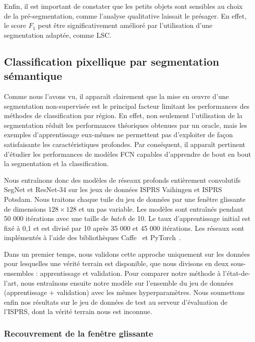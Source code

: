 Enfin, il est important de constater que les petits objets sont sensibles au choix de la pré-segmentation, comme l'analyse qualitative laissait le présager. En effet, le score $F_1$ peut être significativement amélioré par l'utilisation d'une segmentation adaptée, comme \gls{LSC}.

\subsection{Classification pixellique par segmentation sémantique}

Comme nous l'avons vu, il apparaît clairement que la mise en \oe{}uvre d'une segmentation non-supervisée est le principal facteur limitant les performances des méthodes de classification par région. En effet, non seulement l'utilisation de la segmentation réduit les performances théoriques obtenues par un oracle, mais les exemples d'apprentissage eux-mêmes ne permettent pas d'exploiter de façon satisfaisante les caractéristiques profondes. Par conséquent, il apparaît pertinent d'étudier les performances de modèles \gls{FCN} capables d'apprendre de bout en bout la segmentation et la classification.

Nous entraînons donc des modèles de réseaux profonds entièrement convolutifs SegNet et ResNet-34 sur les jeux de données \gls{ISPRS} Vaihingen et \gls{ISPRS} Potsdam.
Nous traitons chaque tuile du jeu de données par une fenêtre glissante de dimensions $128 \times 128$ et un pas variable. Les modèles sont entraînés pendant 50 000 itérations avec une taille de \emph{batch} de 10. Le taux d'apprentissage initial est fixé à 0,1 et est divisé par 10 après 35 000 et 45 000 itérations.
Les réseaux sont implémentés à l'aide des bibliothèques Caffe~\cite{jia_caffe_2014} et PyTorch~\cite{paszke_automatic_2017}.

Dans un premier temps, nous validons cette approche uniquement sur les données pour lesquelles une vérité terrain est disponible, que nous divisons en deux sous-ensembles : apprentissage et validation. Pour comparer notre méthode à l'état-de-l'art, nous entraînons ensuite notre modèle sur l'ensemble du jeu de données (apprentissage + validation) avec les mêmes hyperparamètres. Nous soumettons enfin nos résultats sur le jeu de données de test au serveur d'évaluation de l'\gls{ISPRS}, dont la vérité terrain nous est inconnue.

\subsubsection{Recouvrement de la fenêtre glissante}

